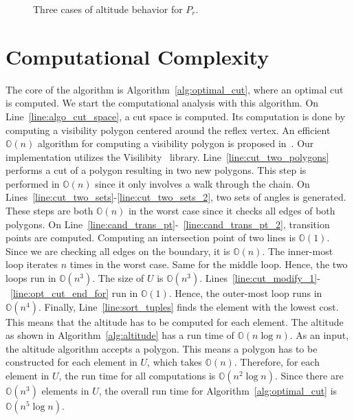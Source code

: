 \documentclass[../main.tex]{subfiles}
\begin{document}
\begin{figure}
	\centering
	\begin{subfigure}{0.45\linewidth}
		\centering
		
		\caption{\label{fig:altitude_case_pr_i}}
	\end{subfigure}%
	\quad
	\begin{subfigure}{0.45\linewidth}
		\centering
		
		\caption{\label{fig:altitude_case_pr_ii}}
	\end{subfigure}
	\begin{subfigure}{0.45\linewidth}
		\centering
		
		\caption{\label{fig:altitude_case_pr_iii}}
	\end{subfigure}
	\caption{Three cases of altitude behavior for $P_r$.}
	\label{fig:altitude_cases_pr}
\end{figure}

\section{Computational Complexity}
\label{section:single_agent_complexity}

The core of the algorithm is Algorithm~\ref{alg:optimal_cut}, where an optimal cut is computed. We start the computational analysis with this algorithm. On Line~\ref{line:algo_cut_space}, a cut space is computed. Its computation is done by computing a visibility polygon centered around the reflex vertex. An efficient $\mathbb{O}(n)$ algorithm for computing a visibility polygon is proposed in~\cite{el1981linear}. Our implementation utilizes the Visilibity~\cite{VisiLibity:08} library. Line~\ref{line:cut_two_polygons} performs a cut of a polygon resulting in two new polygons. This step is performed in $\mathbb{O}(n)$ since it only involves a walk through the chain. On Lines~\ref{line:cut_two_sets}-\ref{line:cut_two_sets_2}, two sets of angles is generated. These steps are both $\mathbb{O}(n)$ in the worst case since it checks all edges of both polygons. On Line~\ref{line:cand_trans_pt}-~\ref{line:cand_trans_pt_2}, transition points are computed. Computing an intersection point of two lines is $\mathbb{O}(1)$. Since we are checking all edges on the boundary, it is $\mathbb{O}(n)$. The inner-most loop iterates $n$ times in the worst case. Same for the middle loop. Hence, the two loops run in $\mathbb{O}(n^3)$. The size of $U$ is $\mathbb{O}(n^3)$. Lines~\ref{line:cut_modify_1}-~\ref{line:opt_cut_end_for} run in $\mathbb{O}(1)$. Hence, the outer-most loop runs in $\mathbb{O}(n^4)$. Finally, Line~\ref{line:sort_tuples} finds the element with the lowest cost. This means that the altitude has to be computed for each element. The altitude as shown in Algorithm~\ref{alg:altitude} has a run time of $\mathbb{O}(n\log{n})$. As an input, the altitude algorithm accepts a polygon. This means a polygon has to be constructed for each element in $U$, which takes $\mathbb{O}(n)$. Therefore, for each element in $U$, the run time for all computations is $\mathbb{O}(n^2\log{n})$. Since there are $\mathbb{O}(n^3)$ elements in $U$, the overall run time for Algorithm~\ref{alg:optimal_cut} is $\mathbb{O}(n^5\log{n})$.
\end{document}
